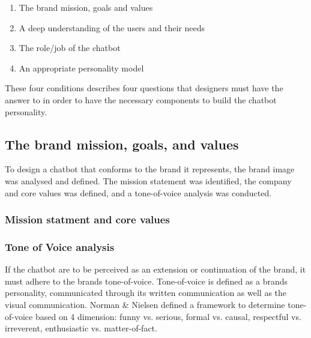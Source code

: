 \begin{enumerate}
    \item The brand mission, goals and values
    \item A deep understanding of the users and their needs
    \item The role/job of the chatbot
    \item An appropriate personality model
\end{enumerate}

These four conditions describes four questions that designers must have the answer to in order to have the necessary components to build the chatbot personality.

\vspace{5mm} %

    \subsection{The brand mission, goals, and values}
    To design a chatbot that conforms to the brand it represents, the brand image was analysed and defined. The mission statement was identified, the company and core values was defined, and a tone-of-voice analysis was conducted.
    
        \subsubsection{Mission statment and core values}
    
    
        \subsubsection{Tone of Voice analysis}
    
        If the chatbot are to be perceived as an extension or continuation of the brand, it must adhere to the brands tone-of-voice. Tone-of-voice is defined as a brands personality, communicated through its written communication as well as the visual communication. Norman & Nielsen defined a framework to determine tone-of-voice based on 4 dimension: funny vs. serious, formal vs. causal, respectful vs. irreverent, enthusiastic vs. matter-of-fact.
    
